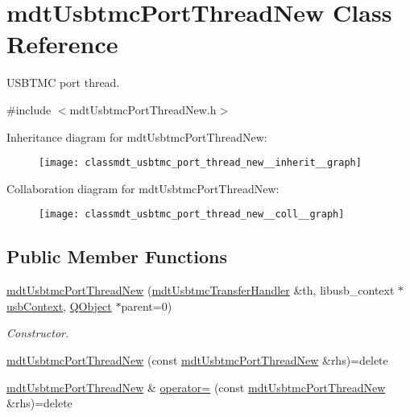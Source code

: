 \hypertarget{classmdt_usbtmc_port_thread_new}{\section{mdt\-Usbtmc\-Port\-Thread\-New Class Reference}
\label{classmdt_usbtmc_port_thread_new}
}


U\-S\-B\-T\-M\-C port thread.  




{\ttfamily \#include $<$mdt\-Usbtmc\-Port\-Thread\-New.\-h$>$}



Inheritance diagram for mdt\-Usbtmc\-Port\-Thread\-New\-:\nopagebreak
\begin{figure}[H]
\begin{center}
\leavevmode
\texttt{[image: classmdt\_usbtmc\_port\_thread\_new\_\_inherit\_\_graph]}
\end{center}
\end{figure}


Collaboration diagram for mdt\-Usbtmc\-Port\-Thread\-New\-:\nopagebreak
\begin{figure}[H]
\begin{center}
\leavevmode
\texttt{[image: classmdt\_usbtmc\_port\_thread\_new\_\_coll\_\_graph]}
\end{center}
\end{figure}
\subsection*{Public Member Functions}
\begin{DoxyCompactItemize}
\item 
\hyperlink{classmdt_usbtmc_port_thread_new_ad26bff8c543252e40db2c26c9699039a}{mdt\-Usbtmc\-Port\-Thread\-New} (\hyperlink{classmdt_usbtmc_transfer_handler}{mdt\-Usbtmc\-Transfer\-Handler} \&th, libusb\-\_\-context $\ast$\hyperlink{classmdt_usb_port_thread_new_a236b21eb4da1bfb1918c2d30afc85ef5}{usb\-Context}, \hyperlink{class_q_object}{Q\-Object} $\ast$parent=0)
\begin{DoxyCompactList}\small\item\em Constructor. \end{DoxyCompactList}\item 
\hyperlink{classmdt_usbtmc_port_thread_new_a38635c8efafa35f7ceda41f1ef8df534}{mdt\-Usbtmc\-Port\-Thread\-New} (const \hyperlink{classmdt_usbtmc_port_thread_new}{mdt\-Usbtmc\-Port\-Thread\-New} \&rhs)=delete
\item 
\hyperlink{classmdt_usbtmc_port_thread_new}{mdt\-Usbtmc\-Port\-Thread\-New} \& \hyperlink{classmdt_usbtmc_port_thread_new_a55525a82833f0966973691be89bed44d}{operator=} (const \hyperlink{classmdt_usbtmc_port_thread_new}{mdt\-Usbtmc\-Port\-Thread\-New} \&rhs)=delete
\end{DoxyCompactItemize}
